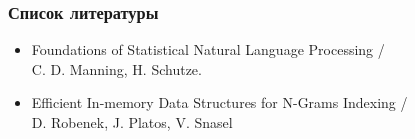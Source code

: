 \documentclass[14pt]{beamer}
\begin{document}
\begin{frame}
\frametitle{Список литературы}
\footnotesize{
\begin{itemize}
  \item Foundations of Statistical Natural Language Processing / \\C. D. Manning, H. Schutze.
  \item Efficient In-memory Data Structures for N-Grams Indexing / \\D. Robenek, J. Platos, V. Snasel
\end{itemize}}
\end{frame}

\begin{frame}
\end{frame}
\end{document}
